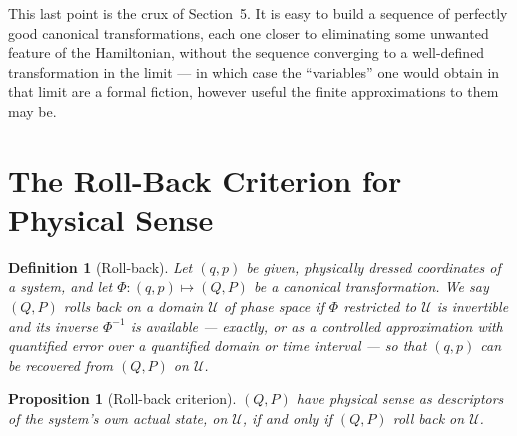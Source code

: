 \documentclass[11pt]{article}
\newtheorem{proposition}{Proposition}
\newtheorem{definition}{Definition}
\begin{document}
This last point is the crux of Section~5. It is easy to build a sequence of perfectly good canonical transformations, each one closer to eliminating some unwanted feature of the Hamiltonian, without the sequence converging to a well-defined transformation in the limit --- in which case the ``variables'' one would obtain in that limit are a formal fiction, however useful the finite approximations to them may be.

\section{The Roll-Back Criterion for Physical Sense}

\begin{definition}[Roll-back]
Let $(q,p)$ be given, physically dressed coordinates of a system, and let $\Phi:(q,p)\mapsto(Q,P)$ be a canonical transformation. We say $(Q,P)$ \emph{rolls back} on a domain $\mathcal U$ of phase space if $\Phi$ restricted to $\mathcal U$ is invertible and its inverse $\Phi^{-1}$ is available --- exactly, or as a controlled approximation with quantified error over a quantified domain or time interval --- so that $(q,p)$ can be recovered from $(Q,P)$ on $\mathcal U$.
\end{definition}

\begin{proposition}[Roll-back criterion]
$(Q,P)$ have physical sense as descriptors of the system's own actual state, on $\mathcal U$, if and only if $(Q,P)$ roll back on $\mathcal U$.
\end{proposition}
\end{document}
